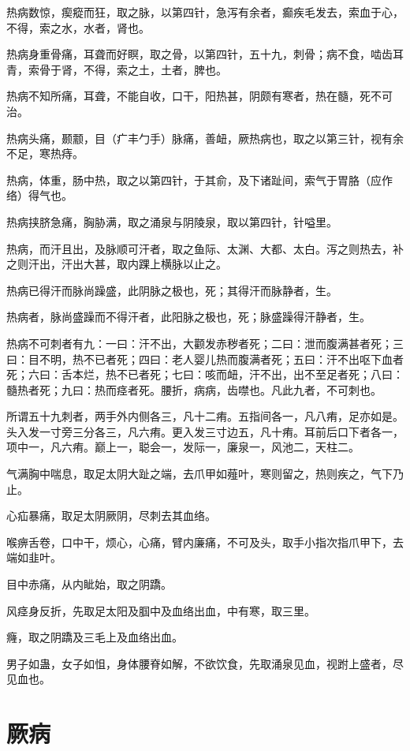 \documentclass[a4paper,12pt,UTF8,twoside]{ctexbook}
\begin{document}
	热病数惊，瘈瘲而狂，取之脉，以第四针，急泻有余者，癫疾毛发去，索血于心，不得，索之水，水者，肾也。
	
	热病身重骨痛，耳聋而好瞑，取之骨，以第四针，五十九，刺骨；病不食，啮齿耳青，索骨于肾，不得，索之土，土者，脾也。
	
	热病不知所痛，耳聋，不能自收，口干，阳热甚，阴颇有寒者，热在髓，死不可治。
	
	热病头痛，颞颥，目（疒丰勹手）脉痛，善衄，厥热病也，取之以第三针，视有余不足，寒热痔。
	
	热病，体重，肠中热，取之以第四针，于其俞，及下诸趾间，索气于胃胳（应作络）得气也。
	
	热病挟脐急痛，胸胁满，取之涌泉与阴陵泉，取以第四针，针嗌里。
	
	热病，而汗且出，及脉顺可汗者，取之鱼际、太渊、大都、太白。泻之则热去，补之则汗出，汗出大甚，取内踝上横脉以止之。
	
	热病已得汗而脉尚躁盛，此阴脉之极也，死；其得汗而脉静者，生。
	
	热病者，脉尚盛躁而不得汗者，此阳脉之极也，死；脉盛躁得汗静者，生。
	
	热病不可刺者有九：一曰：汗不出，大颧发赤秽者死；二曰：泄而腹满甚者死；三曰：目不明，热不已者死；四曰：老人婴儿热而腹满者死；五曰：汗不出呕下血者死；六曰：舌本烂，热不已者死；七曰：咳而衄，汗不出，出不至足者死；八曰：髓热者死；九曰：热而痉者死。腰折，病病，齿噤也。凡此九者，不可刺也。
	
	所谓五十九刺者，两手外内侧各三，凡十二痏。五指间各一，凡八痏，足亦如是。头入发一寸旁三分各三，凡六痏。更入发三寸边五，凡十痏。耳前后口下者各一，项中一，凡六痏。巅上一，聪会一，发际一，廉泉一，风池二，天柱二。
	
	气满胸中喘息，取足太阴大趾之端，去爪甲如薤叶，寒则留之，热则疾之，气下乃止。
	
	心疝暴痛，取足太阴厥阴，尽刺去其血络。
	
	喉痹舌卷，口中干，烦心，心痛，臂内廉痛，不可及头，取手小指次指爪甲下，去端如韭叶。
	
	目中赤痛，从内眦始，取之阴蹻。
	
	风痉身反折，先取足太阳及腘中及血络出血，中有寒，取三里。
	
	癃，取之阴蹻及三毛上及血络出血。
	
	男子如蛊，女子如怚，身体腰脊如解，不欲饮食，先取涌泉见血，视跗上盛者，尽见血也。
	\chapter{厥病}
	
\end{document}
